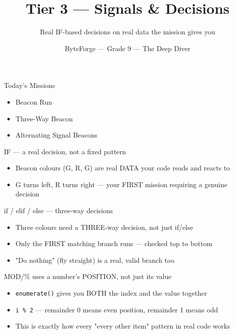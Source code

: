 \documentclass[aspectratio=169]{beamer}
\title{Tier 3 — Signals \& Decisions}
\subtitle{Real IF-based decisions on real data the mission gives you}
\author{ByteForge --- Grade 9 --- The Deep Diver}
\date{}
\begin{document}
\begin{frame}
    \titlepage
\end{frame}

\begin{frame}{Today's Missions}
    \Large
    \begin{itemize}
        \item Beacon Run
        \item Three-Way Beacon
        \item Alternating Signal Beacons
    \end{itemize}
\end{frame}

\begin{frame}{IF --- a real decision, not a fixed pattern}
    \large
    \begin{itemize}
        \item Beacon colours (G, R, G) are real DATA your code reads and reacts to
        \item G turns left, R turns right --- your FIRST mission requiring a genuine decision
    \end{itemize}
\end{frame}


\begin{frame}{if / elif / else --- three-way decisions}
    \large
    \begin{itemize}
        \item Three colours need a THREE-way decision, not just if/else
        \item Only the FIRST matching branch runs --- checked top to bottom
        \item "Do nothing" (fly straight) is a real, valid branch too
    \end{itemize}
\end{frame}


\begin{frame}{MOD/\% uses a number's POSITION, not just its value}
    \large
    \begin{itemize}
        \item \texttt{enumerate()} gives you BOTH the index and the value together
        \item \texttt{i \% 2} --- remainder 0 means even position, remainder 1 means odd
        \item This is exactly how every "every other item" pattern in real code works
    \end{itemize}
\end{frame}
\end{document}
